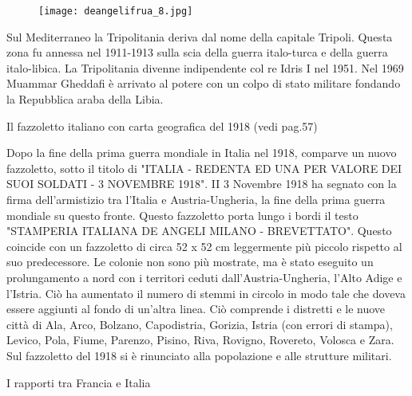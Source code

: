 \newpage

\begin{figure}[h]
	\centering
		\texttt{[image: deangelifrua\_8.jpg]}
	\caption{}
	\label{fig:deangelifrua_8}
\end{figure}

\newpage

Sul Mediterraneo la Tripolitania deriva dal nome della capitale Tripoli. Questa zona fu annessa nel 1911-1913 sulla scia della guerra italo-turca e della guerra italo-libica. La Tripolitania divenne indipendente col re Idris I nel 1951. Nel 1969 Muammar Gheddafi è arrivato al potere con un colpo di stato militare fondando la Repubblica araba della Libia.

Il fazzoletto italiano con carta geografica del 1918
 (vedi pag.57)

Dopo la fine della prima guerra mondiale in Italia nel 1918, comparve un nuovo fazzoletto, sotto il titolo di "ITALIA - REDENTA ED UNA PER VALORE DEI SUOI SOLDATI - 3 NOVEMBRE 1918". II 3 Novembre 1918 ha segnato con la firma dell'armistizio tra l'Italia e Austria-Ungheria, la fine della prima guerra mondiale su questo fronte.
   Questo fazzoletto porta lungo i bordi il testo "STAMPERIA ITALIANA DE ANGELI MILANO - BREVETTATO".  Questo coincide con un fazzoletto di circa 52 x 52 cm leggermente più piccolo rispetto al suo predecessore. Le colonie non sono più mostrate, ma è stato eseguito un prolungamento a nord con i territori ceduti dall'Austria-Ungheria, l'Alto Adige e l'Istria. Ciò ha aumentato il numero di stemmi in circolo in modo tale che doveva essere aggiunti al fondo di un'altra linea. Ciò comprende i distretti e le nuove città di Ala, Arco, Bolzano, Capodistria, Gorizia, Istria (con errori di stampa), Levico, Pola, Fiume, Parenzo, Pisino, Riva, Rovigno, Rovereto, Volosca e Zara. Sul fazzoletto del 1918 si è rinunciato alla popolazione e alle strutture militari.

I rapporti tra Francia e Italia
  
